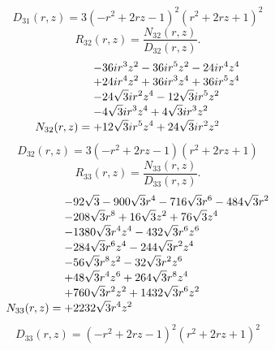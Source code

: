 \documentclass[11pt,a4paper]{article}
\begin{document}
\begin{equation}
D_{31}(r,z)=3 \left(- r^{2} + 2 r z - 1\right)^{2} \left(r^{2} + 2 r z + 1\right)^{2}
\label{eq:cat-denominator-31}
\end{equation}
\begin{equation}
R_{32}(r,z)=\frac{N_{32}(r,z)}{D_{32}(r,z)}.
\label{eq:cat-rational-32}
\end{equation}
\begin{equation}
N_{32}(r,z)=\shortstack[l]{$\displaystyle  - 36 i r^{3} z^{2} - 36 i r^{5} z^{2} - 24 i r^{4} z^{4}$\\
$\displaystyle  + 24 i r^{4} z^{2} + 36 i r^{3} z^{4} + 36 i r^{5} z^{4}$\\
$\displaystyle  - 24 \sqrt{3} i r^{2} z^{4} - 12 \sqrt{3} i r^{5} z^{2}$\\
$\displaystyle  - 4 \sqrt{3} i r^{3} z^{4} + 4 \sqrt{3} i r^{3} z^{2}$\\
$\displaystyle  + 12 \sqrt{3} i r^{5} z^{4} + 24 \sqrt{3} i r^{2} z^{2}$}
\label{eq:cat-numerator-32}
\end{equation}
\begin{equation}
D_{32}(r,z)=3 \left(- r^{2} + 2 r z - 1\right) \left(r^{2} + 2 r z + 1\right)
\label{eq:cat-denominator-32}
\end{equation}
\begin{equation}
R_{33}(r,z)=\frac{N_{33}(r,z)}{D_{33}(r,z)}.
\label{eq:cat-rational-33}
\end{equation}
\begin{equation}
N_{33}(r,z)=\shortstack[l]{$\displaystyle  - 92 \sqrt{3} - 900 \sqrt{3} r^{4} - 716 \sqrt{3} r^{6} - 484 \sqrt{3} r^{2}$\\
$\displaystyle  - 208 \sqrt{3} r^{8} + 16 \sqrt{3} z^{2} + 76 \sqrt{3} z^{4}$\\
$\displaystyle  - 1380 \sqrt{3} r^{4} z^{4} - 432 \sqrt{3} r^{6} z^{6}$\\
$\displaystyle  - 284 \sqrt{3} r^{6} z^{4} - 244 \sqrt{3} r^{2} z^{4}$\\
$\displaystyle  - 56 \sqrt{3} r^{8} z^{2} - 32 \sqrt{3} r^{2} z^{6}$\\
$\displaystyle  + 48 \sqrt{3} r^{4} z^{6} + 264 \sqrt{3} r^{8} z^{4}$\\
$\displaystyle  + 760 \sqrt{3} r^{2} z^{2} + 1432 \sqrt{3} r^{6} z^{2}$\\
$\displaystyle  + 2232 \sqrt{3} r^{4} z^{2}$}
\label{eq:cat-numerator-33}
\end{equation}
\begin{equation}
D_{33}(r,z)=\left(- r^{2} + 2 r z - 1\right)^{2} \left(r^{2} + 2 r z + 1\right)^{2}
\label{eq:cat-denominator-33}
\end{equation}
\end{document}
